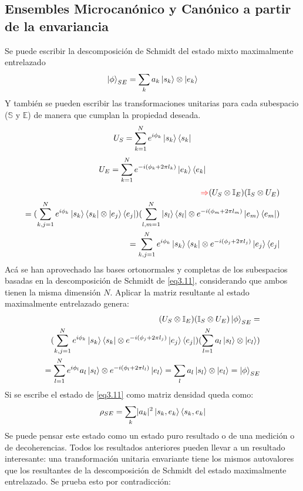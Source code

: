\documentclass{book}
\begin{document}
\subsection{Ensembles Microcanónico y Canónico a partir de la envariancia}
Se puede escribir la descomposición de Schmidt del estado mixto maximalmente entrelazado
\begin{equation}\label{eq3.11}\ket{\phi}_{SE}=\sum_k a_k\ket{s_k}\otimes\ket{e_k}\end{equation}
Y también se pueden escribir las transformaciones unitarias para cada subespacio ($\mathbb{S}$ y $\mathbb{E}$) de manera que cumplan la propiedad deseada.
\begin{equation}\label{eq3.12} U_S=\sum_{k=1}^N e^{i\phi_k}\ket{s_k}\bra{s_k}\end{equation}
\begin{equation}\label{eq3.13}U_E=\sum_{k=1}^N e^{-i(\phi_k+2\pi l_k)}\ket{e_k}\bra{e_k}\end{equation}
\begin{equation}\label{eq3.14} \begin{aligned} \textcolor{red}{\Rightarrow} (U_S\otimes \mathbb{I}_E)(\mathbb{I}_S\otimes U_E)\\ = (\sum_{k,j=1}^N e^{i\phi_k}\ket{s_k}\bra{s_k}\otimes \ket{e_j}\bra{e_j}) (\sum_{l,m=1}^N\ket{s_l}\bra{s_l}\otimes e^{-i(\phi_m+2\pi l_m)}\ket{e_m}\bra{e_m})\\ = \sum_{k,j=1}^N e^{i\phi_k}\ket{s_k}\bra{s_k}\otimes e^{-i(\phi_j+2\pi l_j)}\ket{e_j}\bra{e_j}\end{aligned}\end{equation}
Acá se han aprovechado las bases ortonormales y completas de los subespacios basadas en la descomposición de Schmidt de \ref{eq3.11}, considerando que ambos tienen la misma dimensión $N$. Aplicar la matriz resultante al estado maximalmente entrelazado genera: 
\begin{equation}\label{eq3.15}\begin{aligned}(U_S\otimes \mathbb{I}_E)(\mathbb{I}_S\otimes U_E)\ket{\phi}_{SE}=\\ (\sum_{k,j=1}^N e^{i\phi_k}\ket{s_k}\bra{s_k}\otimes e^{-i(\phi_j+2\pi l_j)}\ket{e_j}\bra{e_j})(\sum_{l=1}^N a_l\ket{s_l}\otimes\ket{e_l})\\ = \sum_{l=1}^N e^{i\phi_l }a_l \ket{s_l}\otimes e^{-i(\phi_l+2\pi l_l)}\ket{e_l}=\sum_l a_l \ket{s_l}\otimes\ket{e_l}=\ket{\phi}_{SE} \end{aligned}\end{equation}Si se escribe el estado de \ref{eq3.11} como matriz densidad queda como:
\begin{equation}\label{eq3.16}\rho_{SE}=\sum_k\lvert a_k\rvert^2\ket{s_k,e_k}\bra{s_k,e_k}\end{equation}
Se puede pensar este estado como un estado puro resultado o de una medición o de decoherencias. Todos los resultados anteriores pueden llevar a un resultado interesante: una transformación unitaria envariante tiene los mismos autovalores que los resultantes de la descomposición de Schmidt del estado maximalmente entrelazado. Se prueba esto por contradicción: 
\end{document}
